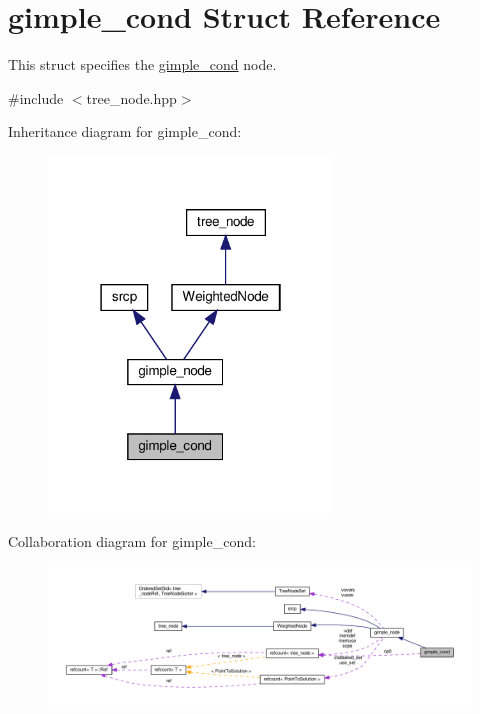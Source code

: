 \hypertarget{structgimple__cond}{}\section{gimple\+\_\+cond Struct Reference}
\label{structgimple__cond}


This struct specifies the \hyperlink{structgimple__cond}{gimple\+\_\+cond} node.  




{\ttfamily \#include $<$tree\+\_\+node.\+hpp$>$}



Inheritance diagram for gimple\+\_\+cond\+:
\nopagebreak
\begin{figure}[H]
\begin{center}
\leavevmode
\includegraphics[width=214pt]{d9/d54/structgimple__cond__inherit__graph}
\end{center}
\end{figure}


Collaboration diagram for gimple\+\_\+cond\+:
\nopagebreak
\begin{figure}[H]
\begin{center}
\leavevmode
\includegraphics[width=350pt]{d2/dff/structgimple__cond__coll__graph}
\end{center}
\end{figure}
